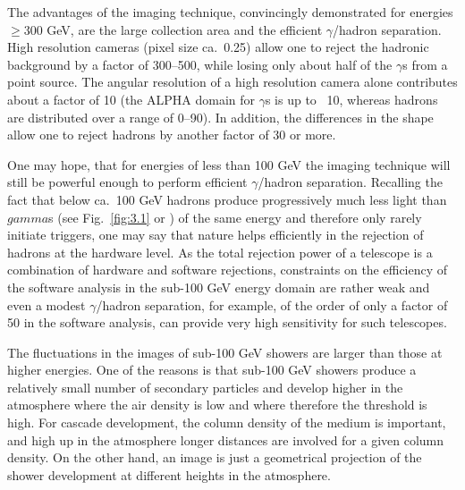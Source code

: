 The advantages of the imaging technique, convincingly demonstrated for 
energies $\geq$300 GeV, are the large collection area and the
efficient $\gamma$/hadron separation.  High resolution cameras (pixel
size ca.~0.25\tdeg) allow one to reject the hadronic background
by a factor of
300--500, while losing only about half of the $\gamma$s from a point
source. The angular resolution of a high resolution camera 
alone contributes about a factor of 10 (the ALPHA domain for $\gamma$s is
up to ~10\tdeg, whereas hadrons are distributed over a range of
0\tdeg--90\tdeg).
In addition, the differences in the shape allow one to reject hadrons
by another factor of 30 or more.

One may hope, that for energies of less than
100 GeV the imaging technique will
still be powerful enough to perform efficient $\gamma$/hadron
separation. Recalling the fact that below ca.~100 GeV hadrons
produce progressively much less light than $gamma$s (see
Fig.~\ref{fig:3.1} or \cite{weekes:77}) of the same energy
and therefore only rarely initiate triggers, one may say that
nature helps  efficiently in the rejection of hadrons at the
hardware level. As the total rejection power of a telescope is a
combination of hardware and software rejections, constraints on the
efficiency of the software analysis in the sub-100 GeV
energy domain are rather weak and even a modest
$\gamma$/hadron separation, for example, of the order of only 
a factor of 50 in the
software analysis, can provide very high sensitivity for such
telescopes.

The fluctuations in the images of sub-100 GeV showers are larger than
those at higher energies. One of the reasons is that sub-100 GeV showers
produce a relatively small number of secondary particles and
develop higher in the atmosphere where the air density is low
and where therefore the \Cerenkov threshold is high. For
cascade development,  the column density of the medium is important, and
high up in the atmosphere longer distances are involved for
a given column density. On the other hand, an image is just a
geometrical projection of the shower development at different heights in
the atmosphere.

